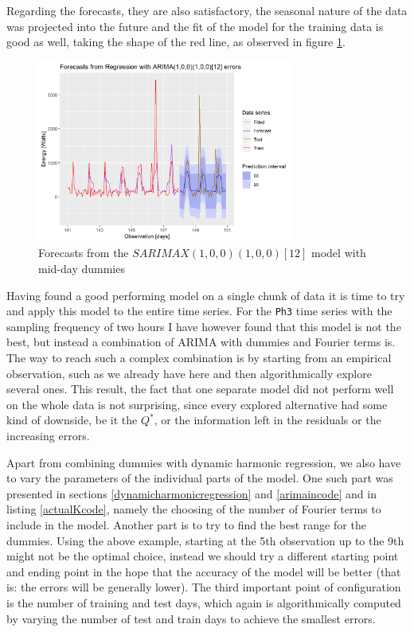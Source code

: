 \documentclass[12pt,a4paper,titlepage]{report}
\begin{document}
Regarding the forecasts, they are also satisfactory, the seasonal nature of the data was projected into the future and the fit of the model for the training data is good as well, taking the shape of the red line, as observed in figure \ref{dlastweek2hrsph3forecastsDummies}.

\begin{figure}[h]
    \centering
    \includegraphics[width=0.75\textwidth]{dlastweek2hrsph3forecastsDummies}
    \caption{Forecasts from the $ SARIMAX(1, 0, 0)(1, 0, 0)[12] $ model with mid-day dummies}
    \label{dlastweek2hrsph3forecastsDummies}
\end{figure}

Having found a good performing model on a single chunk of data it is time to try and apply this model to the entire time series.
For the \texttt{Ph3} time series with the sampling frequency of two hours I have however found that this model is not the best, but instead a combination of ARIMA with dummies and Fourier terms is. The way to reach such a complex combination is by starting from an empirical observation, such as we already have here and then algorithmically explore several ones. This result, the fact that one separate model did not perform well on the whole data is not surprising, since every explored alternative had some kind of downside, be it the $ Q^* $, or the information left in the residuals or the increasing errors.

Apart from combining dummies with dynamic harmonic regression, we also have to vary the parameters of the individual parts of the model.
One such part was presented in sections \ref{dynamicharmonicregression} and \ref{arimaincode} and in listing \ref{actualKcode}, namely the choosing of the number of Fourier terms to include in the model. Another part is to try to find the best range for the dummies. Using the above example, starting at the 5th observation up to the 9th might not be the optimal choice, instead we should try a different starting point and ending point in the hope that the accuracy of the model will be better (that is: the errors will be generally lower). The third important point of configuration is the number of training and test days, which again is algorithmically computed by varying the number of test and train days to achieve the smallest errors. 
\end{document}
